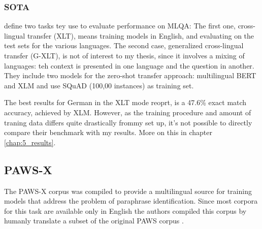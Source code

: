 
\subsubsection{SOTA}
\label{chap:mlqa-sota}

\citeauthor{lewis2019mlqa} define two tasks tey use to evaluate performance on MLQA: The first
one, cross-lingual transfer (XLT), means training models in English, and evaluating on the test
sets for the various languages. The second case, generalized cross-lingual transfer (G-XLT), is
not of interest to my thesis, since it involves a mixing of languages: teh context is presented
in one language and the question in another. They include two models for the zero-shot transfer
approach: multilingual BERT and XLM and use SQuAD (100,00 instances) as training set.

The best results for German in the XLT mode \citeauthor{lewis2019mlqa} reoprt, is a 47.6\% exact
match accuracy, achieved by XLM. However, as the training procedure and amount of traning data
differs quite drastically frommy set up, it's not possible to directly compare their benchmark
with my results. More on this in chapter \ref{chap:5_results}.




\subsection{PAWS-X}

The PAWS-X corpus \cite{yang2019paws} was compiled to provide a multilingual source for training
models that address the problem of paraphrase identification.
Since most corpora for this task are available only in English the authors compiled this corpus by
humanly translate a subset of the original PAWS corpus \cite{zhang2019paws}.

